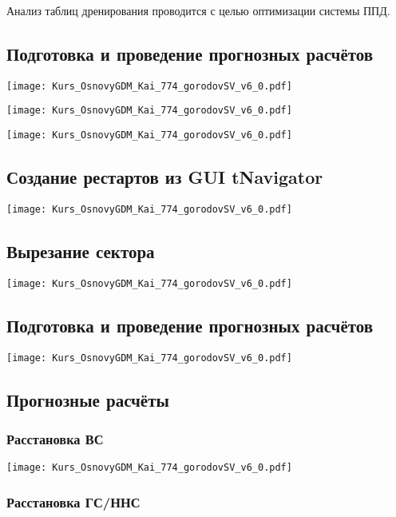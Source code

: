 \documentclass[main.tex]{subfiles}
\begin{document}
Анализ таблиц дренирования проводится с целью оптимизации системы ППД.

\subsection{Подготовка и проведение прогнозных расчётов}

\texttt{[image: Kurs\_OsnovyGDM\_Kai\_774\_gorodovSV\_v6\_0.pdf]}

\texttt{[image: Kurs\_OsnovyGDM\_Kai\_774\_gorodovSV\_v6\_0.pdf]}

\texttt{[image: Kurs\_OsnovyGDM\_Kai\_774\_gorodovSV\_v6\_0.pdf]}

\subsection{Создание рестартов из GUI tNavigator}

\texttt{[image: Kurs\_OsnovyGDM\_Kai\_774\_gorodovSV\_v6\_0.pdf]}

\subsection{Вырезание сектора}

\texttt{[image: Kurs\_OsnovyGDM\_Kai\_774\_gorodovSV\_v6\_0.pdf]}

\subsection{Подготовка и проведение прогнозных расчётов}

\texttt{[image: Kurs\_OsnovyGDM\_Kai\_774\_gorodovSV\_v6\_0.pdf]}

\subsection{Прогнозные расчёты}

\subsubsection{Расстановка ВС}

\texttt{[image: Kurs\_OsnovyGDM\_Kai\_774\_gorodovSV\_v6\_0.pdf]}

\subsubsection{Расстановка ГС/ННС}
\end{document}
